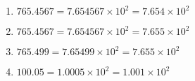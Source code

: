 \begin{enumerate}
	\item $765.4567 = 7.654567 \times 10^2 = 7.654 \times 10^2$
	\item $765.4567 = 7.654567 \times 10^2 = 7.655 \times 10^2$
	\item $765.499 = 7.65499 \times 10^2 = 7.655 \times 10^2$
	\item $100.05 = 1.0005 \times 10^2 = 1.001 \times 10^2$
\end{enumerate}

